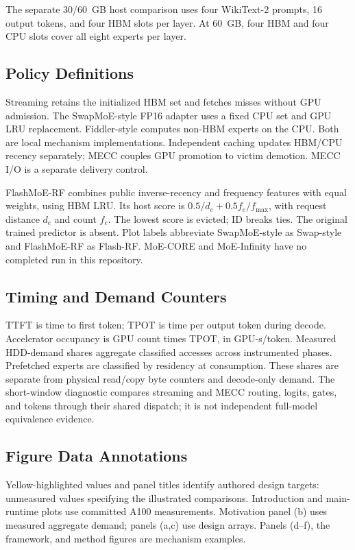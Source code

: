 \documentclass[conference,9pt,letterpaper]{IEEEtran}
\begin{document}
The separate 30/60~GB host comparison uses four WikiText-2 prompts, 16 output tokens, and four HBM slots per layer. At 60~GB, four HBM and four CPU slots cover all eight experts per layer.

\subsection{Policy Definitions}
Streaming retains the initialized HBM set and fetches misses without GPU admission. The SwapMoE-style FP16 adapter uses a fixed CPU set and GPU LRU replacement. Fiddler-style computes non-HBM experts on the CPU. Both are local mechanism implementations. Independent caching updates HBM/CPU recency separately; MECC couples GPU promotion to victim demotion. MECC I/O is a separate delivery control.

FlashMoE-RF combines public inverse-recency and frequency features with equal weights, using HBM LRU. Its host score is $0.5/d_e+0.5f_e/f_{\max}$, with request distance $d_e$ and count $f_e$. The lowest score is evicted; ID breaks ties. The original trained predictor is absent. Plot labels abbreviate SwapMoE-style as Swap-style and FlashMoE-RF as Flash-RF. MoE-CORE and MoE-Infinity have no completed run in this repository.

\subsection{Timing and Demand Counters}
TTFT is time to first token; TPOT is time per output token during decode. Accelerator occupancy is GPU count times TPOT, in GPU-s/token. Measured HDD-demand shares aggregate classified accesses across instrumented phases. Prefetched experts are classified by residency at consumption. These shares are separate from physical read/copy byte counters and decode-only demand. The short-window diagnostic compares streaming and MECC routing, logits, gates, and tokens through their shared dispatch; it is not independent full-model equivalence evidence.

\subsection{Figure Data Annotations}
Yellow-highlighted values and panel titles identify authored design targets: unmeasured values specifying the illustrated comparisons. Introduction and main-runtime plots use committed A100 measurements. Motivation panel (b) uses measured aggregate demand; panels (a,c) use design arrays. Panels (d--f), the framework, and method figures are mechanism examples.
\end{document}
